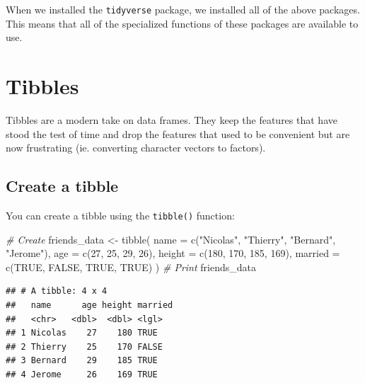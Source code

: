 \documentclass[
]{book}
\newenvironment{Shaded}{\begin{snugshade}}{\end{snugshade}}
\newcommand{\AttributeTok}[1]{\textcolor[rgb]{0.77,0.63,0.00}{#1}}
\newcommand{\CommentTok}[1]{\textcolor[rgb]{0.56,0.35,0.01}{\textit{#1}}}
\newcommand{\ConstantTok}[1]{\textcolor[rgb]{0.00,0.00,0.00}{#1}}
\newcommand{\DecValTok}[1]{\textcolor[rgb]{0.00,0.00,0.81}{#1}}
\newcommand{\FunctionTok}[1]{\textcolor[rgb]{0.00,0.00,0.00}{#1}}
\newcommand{\NormalTok}[1]{#1}
\newcommand{\OtherTok}[1]{\textcolor[rgb]{0.56,0.35,0.01}{#1}}
\newcommand{\StringTok}[1]{\textcolor[rgb]{0.31,0.60,0.02}{#1}}
\begin{document}
When we installed the \texttt{tidyverse} package, we installed all of the above packages. This means that all of the specialized functions of these packages are available to use.

\hypertarget{tibbles}{%
\section{Tibbles}\label{tibbles}}

Tibbles are a modern take on data frames. They keep the features that have stood the test of time and drop the features that used to be convenient but are now frustrating (ie. converting character vectors to factors).

\hypertarget{create-a-tibble}{%
\subsection*{Create a tibble}\label{create-a-tibble}}

You can create a tibble using the \texttt{tibble()} function:

\begin{Shaded}
\begin{Highlighting}[]
\CommentTok{\# Create}
\NormalTok{friends\_data }\OtherTok{\textless{}{-}} \FunctionTok{tibble}\NormalTok{(}
  \AttributeTok{name =} \FunctionTok{c}\NormalTok{(}\StringTok{"Nicolas"}\NormalTok{, }\StringTok{"Thierry"}\NormalTok{, }\StringTok{"Bernard"}\NormalTok{, }\StringTok{"Jerome"}\NormalTok{),}
  \AttributeTok{age =} \FunctionTok{c}\NormalTok{(}\DecValTok{27}\NormalTok{, }\DecValTok{25}\NormalTok{, }\DecValTok{29}\NormalTok{, }\DecValTok{26}\NormalTok{),}
  \AttributeTok{height =} \FunctionTok{c}\NormalTok{(}\DecValTok{180}\NormalTok{, }\DecValTok{170}\NormalTok{, }\DecValTok{185}\NormalTok{, }\DecValTok{169}\NormalTok{),}
  \AttributeTok{married =} \FunctionTok{c}\NormalTok{(}\ConstantTok{TRUE}\NormalTok{, }\ConstantTok{FALSE}\NormalTok{, }\ConstantTok{TRUE}\NormalTok{, }\ConstantTok{TRUE}\NormalTok{)}
\NormalTok{)}
\CommentTok{\# Print}
\NormalTok{friends\_data}
\end{Highlighting}
\end{Shaded}

\begin{verbatim}
## # A tibble: 4 x 4
##   name      age height married
##   <chr>   <dbl>  <dbl> <lgl>  
## 1 Nicolas    27    180 TRUE   
## 2 Thierry    25    170 FALSE  
## 3 Bernard    29    185 TRUE   
## 4 Jerome     26    169 TRUE
\end{verbatim}
\end{document}
